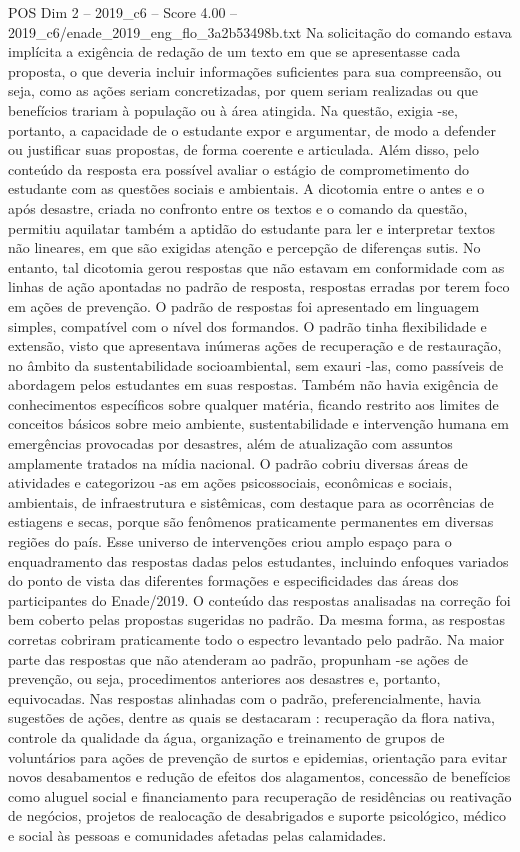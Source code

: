 \begin{textsample}{POS Dim 2 – 2019\_c6 – Score 4.00 – 2019\_c6/enade\_2019\_eng\_flo\_3a2b53498b.txt}
Na solicitação do comando estava implícita a exigência de redação de um texto em que se apresentasse cada proposta, o que deveria incluir informações suficientes para sua compreensão, ou seja, como as ações seriam concretizadas, por quem seriam realizadas ou que benefícios trariam à população ou à área atingida.
Na questão, exigia -se, portanto, a capacidade de o estudante expor e argumentar, de modo a defender ou justificar suas propostas, de forma coerente e articulada.
Além disso, pelo conteúdo da resposta era possível avaliar o estágio de comprometimento do estudante com as questões sociais e ambientais.
A dicotomia entre o antes e o após desastre, criada no confronto entre os textos e o comando da questão, permitiu aquilatar também a aptidão do estudante para ler e interpretar textos não lineares, em que são exigidas atenção e percepção de diferenças sutis.
No entanto, tal dicotomia gerou respostas que não estavam em conformidade com as linhas de ação apontadas no padrão de resposta, respostas erradas por terem foco em ações de prevenção.
O padrão de respostas foi apresentado em linguagem simples, compatível com o nível dos formandos.
O padrão tinha flexibilidade e extensão, visto que apresentava inúmeras ações de recuperação e de restauração, no âmbito da sustentabilidade socioambiental, sem exauri -las, como passíveis de abordagem pelos estudantes em suas respostas.
Também não havia exigência de conhecimentos específicos sobre qualquer matéria, ficando restrito aos limites de conceitos básicos sobre meio ambiente, sustentabilidade e intervenção humana em emergências provocadas por desastres, além de atualização com assuntos amplamente tratados na mídia nacional.
O padrão cobriu diversas áreas de atividades e categorizou -as em ações psicossociais, econômicas e sociais, ambientais, de infraestrutura e sistêmicas, com destaque para as ocorrências de estiagens e secas, porque são fenômenos praticamente permanentes em diversas regiões do país.
Esse universo de intervenções criou amplo espaço para o enquadramento das respostas dadas pelos estudantes, incluindo enfoques variados do ponto de vista das diferentes formações e especificidades das áreas dos participantes do Enade/2019.
O conteúdo das respostas analisadas na correção foi bem coberto pelas propostas sugeridas no padrão.
Da mesma forma, as respostas corretas cobriram praticamente todo o espectro levantado pelo padrão.
Na maior parte das respostas que não atenderam ao padrão, propunham -se ações de prevenção, ou seja, procedimentos anteriores aos desastres e, portanto, equivocadas.
Nas respostas alinhadas com o padrão, preferencialmente, havia sugestões de ações, dentre as quais se destacaram : recuperação da flora nativa, controle da qualidade da água, organização e treinamento de grupos de voluntários para ações de prevenção de surtos e epidemias, orientação para evitar novos desabamentos e redução de efeitos dos alagamentos, concessão de benefícios como aluguel social e financiamento para recuperação de residências ou reativação de negócios, projetos de realocação de desabrigados e suporte psicológico, médico e social às pessoas e comunidades afetadas pelas calamidades.

\end{textsample}
